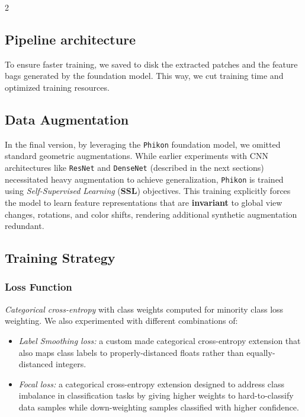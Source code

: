 \documentclass[11pt]{article}
\begin{document}
\begin{multicols}{2}
        \subsection{Pipeline architecture}
        To ensure faster training, we saved to disk the extracted patches and the feature bags generated by the foundation model. This way, we cut training time and optimized training resources.        
        \vspace{-4mm}
        
        \subsection{Data Augmentation}
        In the final version, by leveraging the \texttt{Phikon} foundation model, we omitted standard geometric augmentations. While earlier experiments with CNN architectures like \texttt{ResNet} and \texttt{DenseNet} (described in the next sections) necessitated heavy augmentation to achieve generalization, \texttt{Phikon} is trained using \textit{Self-Supervised Learning} (\textbf{SSL}) objectives. This training explicitly forces the model to learn feature representations that are \textbf{invariant} to global view changes, rotations, and color shifts, rendering additional synthetic augmentation redundant.
        \vspace{-4mm}
        \subsection{Training Strategy}
        \subsubsection{Loss Function}
        \vspace{-2mm}
        \textit{Categorical cross-entropy} with class weights computed for minority class loss weighting.
        We also experimented with different combinations of:
        \begin{itemize}[noitemsep,topsep=0pt]
            \setlength{\itemsep}{1pt}
            \setlength{\parskip}{0pt}
            \setlength{\parsep}{0pt}
            \item  \textit{Label Smoothing loss:} a custom made categorical cross-entropy extension that also maps class labels to properly-distanced floats rather than equally-distanced integers. 
            \item \textit{Focal loss:} a categorical cross-entropy extension designed to address class imbalance in classification tasks by giving higher weights to hard-to-classify data samples while down-weighting samples classified with higher confidence. 


\end{itemize}
\end{multicols}
\end{document}
